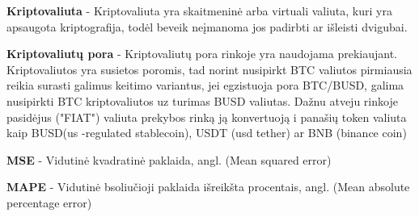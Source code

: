 \documentclass{VUMIFInfKursinis}
\begin{document}
\textbf{Kriptovaliuta} - Kriptovaliuta yra skaitmeninė arba virtuali valiuta, kuri yra apsaugota kriptografija, todėl beveik neįmanoma jos padirbti ar išleisti dvigubai.

\textbf{Kriptovaliutų pora} - Kriptovaliutų pora rinkoje yra naudojama prekiaujant. Kriptovaliutos yra susietos poromis, tad norint nusipirkt BTC valiutos pirmiausia reikia surasti 
galimus keitimo variantus, jei egzistuoja pora BTC/BUSD, galima nusipirkti BTC kriptovaliutos uz turimas BUSD valiutas. Dažnu atveju rinkoje pasidėjus ("FIAT") valiuta
prekybos rinką ją konvertuoją i panašių token valiuta kaip BUSD(us -regulated stablecoin), USDT (usd tether) ar BNB (binance coin)

\textbf{MSE} - Vidutinė kvadratinė paklaida, angl. (Mean squared error)

\textbf{MAPE} - Vidutinė  bsoliučioji paklaida išreikšta procentais, angl. (Mean absolute percentage error)

\printbibliography[heading=bibintoc] %

\appendix  %
\end{document}
